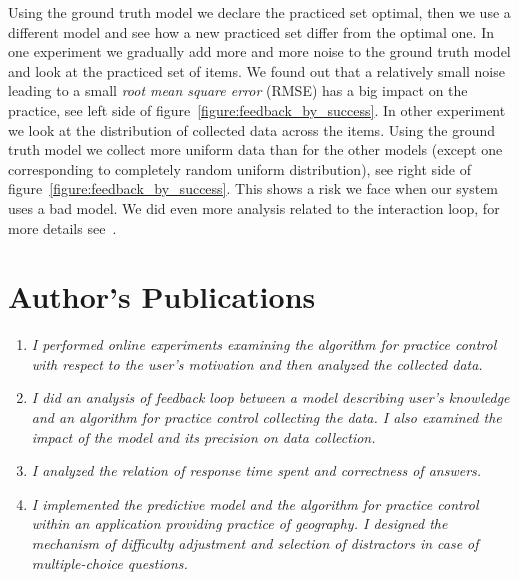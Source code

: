 \documentclass[table,color,cover,twoside,nolot,nolof]{fithesis3/fithesis3}
\begin{document}
Using the ground truth model we declare the practiced set
optimal, then we use a different model and see how a new practiced set
differ from the optimal one. In one experiment we gradually add more and more
noise to the ground truth model and look at the practiced set of items. We
found out that a relatively small noise leading to a small \emph{root mean
square error} (RMSE) has a big impact on the practice, see left side of
figure~\ref{figure:feedback_by_success}. In other experiment we look at the
distribution of collected data across the items. Using the ground truth model
we collect more uniform data than for the other models (except one
corresponding to completely random uniform distribution), see right side of
figure~\ref{figure:feedback_by_success}. This shows a risk we face when our
system uses a bad model. We did even more analysis related to the interaction
loop, for more details see~\cite{niznan2015exploring}.

\chapter{Author's Publications}

\begin{enumerate}
	\item {}

		\textit{I performed online experiments examining the algorithm for practice
			control with respect to the user's motivation and then analyzed the collected
			data.}
	\item {}

		\textit{I did an analysis of feedback loop between a model describing
			user's knowledge and an algorithm for practice control collecting the
			data. I also examined the impact of the model and its precision on data
			collection.}
	\item {}

		\textit{I analyzed the relation of response time spent  and correctness of answers.}

	\item {}

		\textit{I implemented the predictive model and the algorithm for practice
			control within an application providing practice of geography. I designed
			the mechanism of difficulty adjustment and selection of distractors in case of
			multiple-choice questions.}
\end{enumerate}
\end{document}
